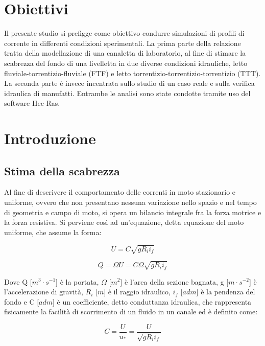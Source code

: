 \documentclass[12pt]{article} %
\begin{document}
\section{Obiettivi}

\noindent Il presente studio si prefigge come obiettivo condurre simulazioni di profili di corrente in differenti condizioni sperimentali.
La prima parte della relazione tratta della modellazione di una canaletta di laboratorio, al fine di stimare la scabrezza del fondo di una livelletta in due diverse condizioni idrauliche, letto fluviale-torrentizio-fluviale (FTF) e letto torrentizio-torrentizio-torrentizio (TTT). La seconda parte è invece incentrata sullo studio di un caso reale e sulla verifica idraulica di manufatti.
Entrambe le analisi sono state condotte tramite uso del software Hec-Ras.

\newpage
\section{Introduzione}
\subsection{Stima della scabrezza}
\noindent Al fine di descrivere il comportamento delle correnti in moto stazionario e uniforme, ovvero che non presentano nessuna variazione nello spazio e nel tempo di geometria e campo di moto, si opera un bilancio integrale fra la forza motrice e la forza resistiva. Si perviene così ad un’equazione, detta equazione del moto uniforme, che assume la forma:

\begin{equation}
    U=C\sqrt{gR_ii_f}
    \label{eqn:U_moto_uniforme}
\end{equation}

\begin{equation}
    Q=\Omega U=C\Omega\sqrt{gR_ii_f}
    \label{eqn:Q_moto_uniforme}
\end{equation}

\noindent Dove Q [$m^3\cdot s^{-1}$] è la portata, $\Omega$ [$m^2$] è l’area della sezione bagnata, g [$m\cdot s^{-2}$] è l’accelerazione di gravità, $R_i$ [$m$] è il raggio idraulico, $i_f$ [$adm$] è la pendenza del fondo e C [$adm$] è un coefficiente, detto conduttanza idraulica, che rappresenta fisicamente la facilità di scorrimento di un fluido in un canale ed è definito come:

\begin{equation}
    C=\frac{U}{u_*}=\frac{U}{\sqrt{gR_ii_f}}
    \label{eqn:C}
\end{equation}
\end{document}

